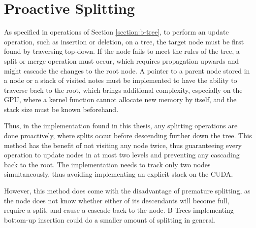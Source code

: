 \section{Proactive Splitting}

As specified in operations of Section \ref{section:b-tree}, to perform an update operation, such as insertion or deletion, on a tree, the target node must be first found by traversing top-down. If the node fails to meet the rules  of the tree, a split or merge operation must occur, which requires propagation upwards and might cascade the changes to the root node. A pointer to a parent node stored in a node or a stack of visited notes must be implemented to have the ability to traverse back to the root, which brings additional complexity, especially on the GPU, where a kernel function cannot allocate new memory by itself, and the stack size must be known beforehand.

Thus, in the implementation found in this thesis, any splitting operations are done proactively, where splits occur before descending further down the tree. This method has the benefit of not visiting any node twice, thus guaranteeing every operation to update nodes in at most two levels and preventing any cascading back to the root. The implementation needs to track only two nodes simultaneously, thus avoiding implementing an explicit stack on the CUDA.

However, this method does come with the disadvantage of premature splitting, as the node does not know whether either of its descendants will become full, require a split, and cause a cascade back to the node. B-Trees implementing bottom-up insertion could do a smaller amount of splitting in general.

